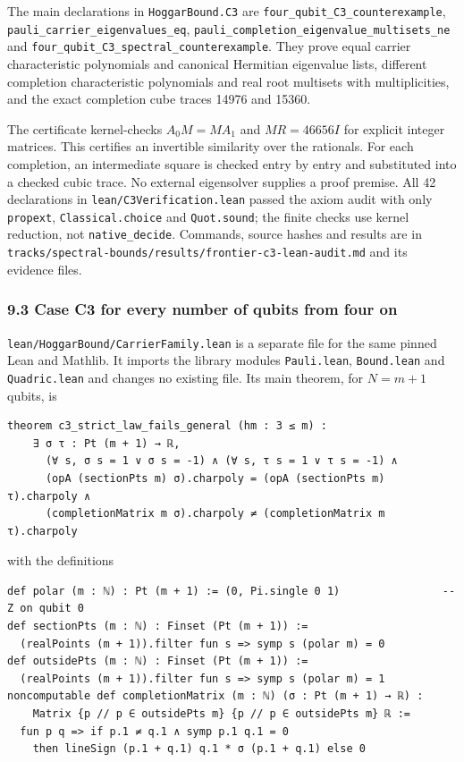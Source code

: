 \documentclass[11pt,a4paper]{article}
\begin{document}
The main declarations in \texttt{HoggarBound.C3} are \nolinkurl{four_qubit_C3_counterexample},
\nolinkurl{pauli_carrier_eigenvalues_eq}, \nolinkurl{pauli_completion_eigenvalue_multisets_ne} and
\nolinkurl{four_qubit_C3_spectral_counterexample}. They prove equal carrier characteristic polynomials and
canonical Hermitian eigenvalue lists, different completion characteristic polynomials and real root
multisets with multiplicities, and the exact completion cube traces 14976 and 15360.

The certificate kernel-checks \(A_0M=MA_1\) and \(MR=46656I\) for explicit integer matrices. This
certifies an invertible similarity over the rationals. For each completion, an intermediate square
is checked entry by entry and substituted into a checked cubic trace. No external eigensolver supplies
a proof premise. All 42 declarations in \nolinkurl{lean/C3Verification.lean} passed the axiom audit with only
\texttt{propext}, \texttt{Classical.choice} and \texttt{Quot.sound}; the finite checks use kernel reduction, not
\texttt{native\_decide}. Commands, source hashes and results are in \nolinkurl{tracks/spectral-bounds/results/frontier-c3-lean-audit.md} and
its evidence files.

\subsubsection{9.3 Case C3 for every number of qubits from four on}\label{93-case-c3-for-every-number-of-qubits-from-four-on}

\nolinkurl{lean/HoggarBound/CarrierFamily.lean} is a separate file for the same pinned Lean and Mathlib. It
imports the library modules \texttt{Pauli.lean}, \texttt{Bound.lean} and \texttt{Quadric.lean} and changes no existing
file. Its main theorem, for \(N=m+1\) qubits, is

\begin{verbatim}
theorem c3_strict_law_fails_general (hm : 3 ≤ m) :
    ∃ σ τ : Pt (m + 1) → ℝ,
      (∀ s, σ s = 1 ∨ σ s = -1) ∧ (∀ s, τ s = 1 ∨ τ s = -1) ∧
      (opA (sectionPts m) σ).charpoly = (opA (sectionPts m) τ).charpoly ∧
      (completionMatrix m σ).charpoly ≠ (completionMatrix m τ).charpoly
\end{verbatim}

with the definitions

\begin{verbatim}
def polar (m : ℕ) : Pt (m + 1) := (0, Pi.single 0 1)                -- Z on qubit 0
def sectionPts (m : ℕ) : Finset (Pt (m + 1)) :=
  (realPoints (m + 1)).filter fun s => symp s (polar m) = 0
def outsidePts (m : ℕ) : Finset (Pt (m + 1)) :=
  (realPoints (m + 1)).filter fun s => symp s (polar m) = 1
noncomputable def completionMatrix (m : ℕ) (σ : Pt (m + 1) → ℝ) :
    Matrix {p // p ∈ outsidePts m} {p // p ∈ outsidePts m} ℝ :=
  fun p q => if p.1 ≠ q.1 ∧ symp p.1 q.1 = 0
    then lineSign (p.1 + q.1) q.1 * σ (p.1 + q.1) else 0
\end{verbatim}
\end{document}
